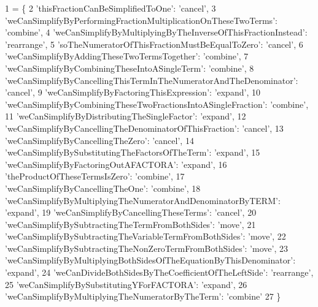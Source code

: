 \begin{DoxyCode}
1 = \{
2 \textcolor{stringliteral}{'thisFractionCanBeSimplifiedToOne'}: \textcolor{stringliteral}{'cancel'},
3 \textcolor{stringliteral}{'weCanSimplifyByPerformingFractionMultiplicationOnTheseTwoTerms'}: \textcolor{stringliteral}{'combine'},
4 \textcolor{stringliteral}{'weCanSimplifyByMultiplyingByTheInverseOfThisFractionInstead'}: \textcolor{stringliteral}{'rearrange'},
5 \textcolor{stringliteral}{'soTheNumeratorOfThisFractionMustBeEqualToZero'}: \textcolor{stringliteral}{'cancel'},
6 \textcolor{stringliteral}{'weCanSimplifyByAddingTheseTwoTermsTogether'}: \textcolor{stringliteral}{'combine'},
7 \textcolor{stringliteral}{'weCanSimplifyByCombiningTheseIntoASingleTerm'}: \textcolor{stringliteral}{'combine'},
8 \textcolor{stringliteral}{'weCanSimplifyByCancellingThisTermInTheNumeratorAndTheDenominator'}: \textcolor{stringliteral}{'cancel'},
9 \textcolor{stringliteral}{'weCanSimplifyByFactoringThisExpression'}: \textcolor{stringliteral}{'expand'},
10 \textcolor{stringliteral}{'weCanSimplifyByCombiningTheseTwoFractionsIntoASingleFraction'}: \textcolor{stringliteral}{'combine'},
11 \textcolor{stringliteral}{'weCanSimplifyByDistributingTheSingleFactor'}: \textcolor{stringliteral}{'expand'},
12 \textcolor{stringliteral}{'weCanSimplifyByCancellingTheDenominatorOfThisFraction'}: \textcolor{stringliteral}{'cancel'},
13 \textcolor{stringliteral}{'weCanSimplifyByCancellingTheZero'}: \textcolor{stringliteral}{'cancel'},
14 \textcolor{stringliteral}{'weCanSimplifyBySubstitutingTheFactorsOfTheTerm'}: \textcolor{stringliteral}{'expand'},
15 \textcolor{stringliteral}{'weCanSimplifyByFactoringOutAFACTORA'}: \textcolor{stringliteral}{'expand'},
16 \textcolor{stringliteral}{'theProductOfTheseTermsIsZero'}: \textcolor{stringliteral}{'combine'},
17 \textcolor{stringliteral}{'weCanSimplifyByCancellingTheOne'}: \textcolor{stringliteral}{'combine'},
18 \textcolor{stringliteral}{'weCanSimplifyByMultiplyingTheNumeratorAndDenominatorByTERM'}: \textcolor{stringliteral}{'expand'},
19 \textcolor{stringliteral}{'weCanSimplifyByCancellingTheseTerms'}: \textcolor{stringliteral}{'cancel'},
20 \textcolor{stringliteral}{'weCanSimplifyBySubtractingTheTermFromBothSides'}: \textcolor{stringliteral}{'move'},
21 \textcolor{stringliteral}{'weCanSimplifyBySubtractingTheVariableTermFromBothSides'}: \textcolor{stringliteral}{'move'},
22 \textcolor{stringliteral}{'weCanSimplifyBySubtractingTheNonZeroTermFromBothSides'}: \textcolor{stringliteral}{'move'},
23 \textcolor{stringliteral}{'weCanSimplifyByMultiplyingBothSidesOfTheEquationByThisDenominator'}: \textcolor{stringliteral}{'expand'},
24 \textcolor{stringliteral}{'weCanDivideBothSidesByTheCoefficientOfTheLeftSide'}: \textcolor{stringliteral}{'rearrange'},
25 \textcolor{stringliteral}{'weCanSimplifyBySubstitutingYForFACTORA'}: \textcolor{stringliteral}{'expand'},
26 \textcolor{stringliteral}{'weCanSimplifyByMultiplyingTheNumeratorByTheTerm'}: \textcolor{stringliteral}{'combine'}
27 \}
\end{DoxyCode}


